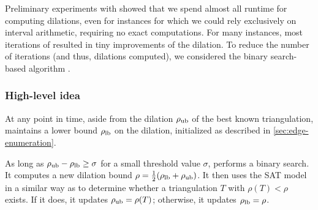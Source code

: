 %
%
Preliminary experiments with \incmdt{} showed that we spend almost all runtime for computing dilations, 
even for instances for which we could rely exclusively on interval arithmetic, requiring no exact computations.
For many instances, most iterations of \incmdt{} resulted in tiny improvements of the dilation.
To reduce the number of iterations (and thus, dilations computed), 
we considered the binary search-based algorithm \binmdt{}.

\subsubsection{High-level idea}
At any point in time, aside from the dilation $\rho_{\text{ub}}$ of the best known triangulation,
\binmdt{} maintains a lower bound $\rho_{\text{lb}}$ on the dilation, initialized as described in \cref{sec:edge-enumeration}.

As long as $\rho_{\text{ub}}-\rho_{\text{lb}} \geq \sigma$ for a small threshold value $\sigma$, \binmdt{} performs a binary search.
It computes a new dilation bound $\rho = \frac{1}{2}(\rho_{\text{lb}} + \rho_{\text{ub}})$.
It then uses the SAT model in a similar way as \incmdt{} to determine whether a triangulation $T$ with $\rho(T) < \rho$ exists.
If it does, it updates $\rho_{\text{ub}} = \rho(T)$; otherwise, it updates $\rho_{\text{lb}} = \rho$.


